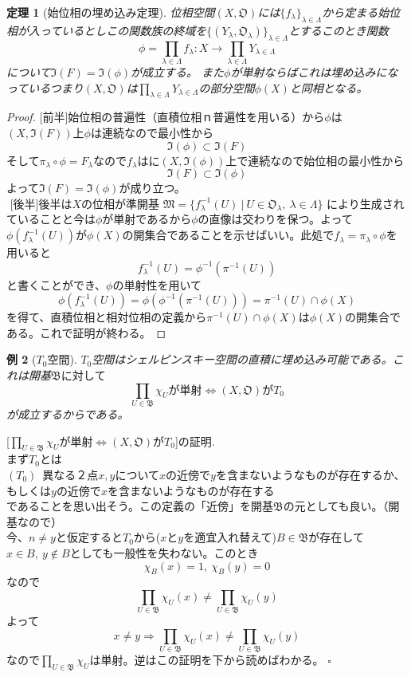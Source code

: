 \documentclass{jsarticle}
\newtheorem{theorem}{定理}
\newtheorem{example}[theorem]{例}
\begin{document}
\begin{theorem}[始位相の埋め込み定理]\label{main}位相空間$(X,\mathfrak{O})$には$\{f_{\lambda}\}_{\lambda \in \Lambda}$から定まる始位相が入っているとしこの関数族の終域を$\{(Y_{\lambda},\mathfrak{O}_{\lambda})\}_{\lambda \in \Lambda}$とするこのとき関数
\[
\phi=\prod_{\lambda\in \Lambda}f_{\lambda}:X\rightarrow \prod_{\lambda\in \Lambda}Y_{\lambda \in \Lambda}
\]について$\mathfrak{I}(F)=\mathfrak{I}(\phi)$が成立する。
また$\phi$が単射ならばこれは埋め込みになっているつまり$(X,\mathfrak{O})$は$\prod_{\lambda\in \Lambda}Y_{\lambda \in \Lambda}$の部分空間$\phi(X)$と同相となる。
\end{theorem}
\begin{proof}${}$[前半]始位相の普遍性（直積位相ｎ普遍性を用いる）から$\phi$は$(X,\mathfrak{I}(F))$上$\phi$は連続なので最小性から
\[
\mathfrak{I}(\phi)\subset \mathfrak{I}(F)
\]そして$\pi_{\lambda}\circ \phi=F_{\lambda}$なので$f_{\lambda}$はに$(X,\mathfrak{I}(\phi))$上で連続なので始位相の最小性から
\[
\mathfrak{I}(F)\subset \mathfrak{I}(\phi)
\]
よって$\mathfrak{I}(F)=\mathfrak{I}(\phi)$が成り立つ。\\ ${}$
[後半]後半は$X$の位相が準開基
$\mathfrak{M}=\{f_{\lambda}^{-1}(U)\ |\ U\in \mathfrak{O}_{\lambda},\ \lambda\in \Lambda \}$
により生成されていることと今は$\phi$が単射であるから$\phi$の直像は交わりを保つ。よって$\phi(f_{\lambda}^{-1}(U))$が$\phi(X)$の開集合であることを示せばいい。此処で$f_{\lambda}=\pi _{\lambda}\circ \phi$を用いると
\[
f_{\lambda}^{-1}(U)=\phi^{-1}(\pi ^{-1}(U))
\]
と書くことができ、$\phi$の単射性を用いて
\[
\phi(f_{\lambda}^{-1}(U))=\phi(\phi^{-1}(\pi ^{-1}(U)))=\pi^{-1}(U)\cap \phi(X)
\]
を得て、直積位相と相対位相の定義から$\pi^{-1}(U)\cap \phi(X)$は$\phi(X)$の開集合である。これで証明が終わる。
\end{proof}
\begin{example}[$T_{0}$空間]$T_{0}$空間はシェルピンスキー空間の直積に埋め込み可能である。これは開基$\mathfrak{B}に対して$\\
\[
\prod_{U\in \mathfrak{B}}\chi_{U}が単射\Leftrightarrow (X,\mathfrak{O})がT_{0}
\]が成立するからである。
\end{example}
[$\displaystyle{\prod_{U\in \mathfrak{B}}\chi_{U}が単射\Leftrightarrow (X,\mathfrak{O})がT_{0}}$]の証明.\\ 
まず$T_0$とは\\ $(T_0)$\  異なる２点$x,y$について$x$の近傍で$y$を含まないようなものが存在するか、もしくは$y$の近傍で$x$を含まないようなものが存在する\\ 
であることを思い出そう。この定義の「近傍」を開基$\mathfrak{B}$の元としても良い。（開基なので）\\ 今、$n\neq y$と仮定すると$T_0$から($x$と$y$を適宜入れ替えて)$B\in \mathfrak{B}$が存在して$x\in B,\ y\not\in B$としても一般性を失わない。このとき
\[
\chi_B(x)=1,\ \chi_B(y)=0
\]なので
\[
\prod_{U\in \mathfrak{B}}\chi_{U}(x)\neq \prod_{U\in \mathfrak{B}}\chi_{U}(y)
\]よって
\[
x\neq y\Rightarrow \prod_{U\in \mathfrak{B}}\chi_{U}(x)\neq \prod_{U\in \mathfrak{B}}\chi_{U}(y)
\]なので$\prod_{U\in \mathfrak{B}}\chi_{U}$は単射。逆はこの証明を下から読めばわかる。
$\square$
\end{document}
